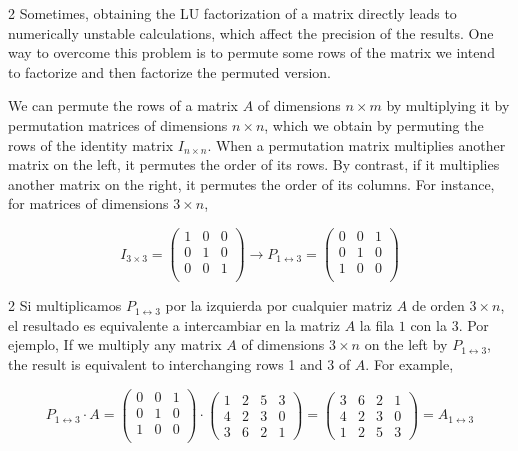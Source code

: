 \begin{paracol}{2}
Sometimes, obtaining the LU factorization of a matrix directly leads to numerically unstable calculations, which affect the precision of the results. One way to overcome this problem is to permute some rows of the matrix we intend to factorize and then factorize the permuted version.

We can permute the rows of a matrix $A$ of dimensions $n\times m$ by multiplying it by permutation matrices of dimensions $n\times n$, which we obtain by permuting the rows of the identity matrix $I_{n\times n}$. When a permutation matrix multiplies another matrix on the left, it permutes the order of its rows. By contrast, if it multiplies another matrix on the right, it permutes the order of its columns. For instance, for matrices of dimensions $3\times n$, 

\end{paracol}
\begin{equation*}
I_{3 \times 3}=\begin{pmatrix}
1& 0& 0\\
0& 1& 0\\
0& 0& 1\\
\end{pmatrix} \rightarrow P_{1 \leftrightarrow 3}= \begin{pmatrix}
0& 0& 1\\
0& 1& 0\\
1& 0& 0\\
\end{pmatrix}
\end{equation*}
\begin{paracol}{2}
Si multiplicamos $P_{1 \leftrightarrow 3}$ por la izquierda por cualquier matriz $A$ de orden $3\times n$, el resultado es equivalente a intercambiar en la matriz $A$ la fila $1$ con la $3$. Por ejemplo,
\switchcolumn
If we multiply any matrix $A$ of dimensions $3\times n$ on the left by $P_{1\leftrightarrow 3}$, the result is equivalent to interchanging rows 1 and 3 of $A$. For example, 
\end{paracol}
\begin{equation*}
P_{1\leftrightarrow 3}\cdot A=\begin{pmatrix}
0& 0& 1\\
0& 1& 0\\
1& 0& 0\\
\end{pmatrix} \cdot \begin{pmatrix}
1& 2& 5& 3\\
4& 2& 3& 0\\
3& 6& 2& 1
\end{pmatrix} = \begin{pmatrix}
3& 6& 2& 1\\
4& 2& 3& 0\\
1& 2& 5& 3
\end{pmatrix}= A_{1\leftrightarrow 3}
\end{equation*}

